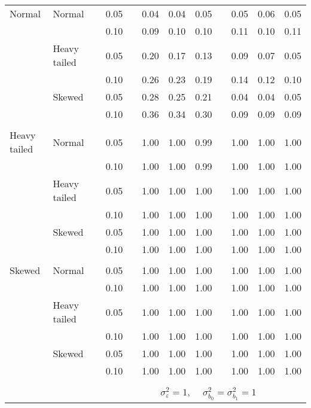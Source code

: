 \begin{table}[ht]
\begin{scriptsize}
\begin{tabular}{ll p{.1cm} c p{.1cm} rrr p{.1cm} rrr}
\rowcolor{gray!20}Normal       & Normal       && 0.05 &&  0.04 & 0.04 & 0.05 && 0.05 & 0.06 & 0.05 \\ 
\rowcolor{gray!20}             &              && 0.10 &&  0.09 & 0.10 & 0.10 && 0.11 & 0.10 & 0.11 \\ 
\rowcolor{gray!20}             & Heavy tailed && 0.05 &&  0.20 & 0.17 & 0.13 && 0.09 & 0.07 & 0.05 \\ 
\rowcolor{gray!20}             &              && 0.10 &&  0.26 & 0.23 & 0.19 && 0.14 & 0.12 & 0.10 \\ 
\rowcolor{gray!20}             & Skewed       && 0.05 &&  0.28 & 0.25 & 0.21 && 0.04 & 0.04 & 0.05 \\ 
\rowcolor{gray!20}             &              && 0.10 &&  0.36 & 0.34 & 0.30 && 0.09 & 0.09 & 0.09 \\ 
             &&&&&&&&&&&\\
Heavy tailed & Normal       && 0.05 &&  1.00 & 1.00 & 0.99 && 1.00 & 1.00 & 1.00 \\ 
             &              && 0.10 &&  1.00 & 1.00 & 0.99 && 1.00 & 1.00 & 1.00 \\ 
             & Heavy tailed && 0.05 &&  1.00 & 1.00 & 1.00 && 1.00 & 1.00 & 1.00 \\ 
             &              && 0.10 &&  1.00 & 1.00 & 1.00 && 1.00 & 1.00 & 1.00 \\ 
             & Skewed       && 0.05 &&  1.00 & 1.00 & 1.00 && 1.00 & 1.00 & 1.00 \\ 
             &              && 0.10 &&  1.00 & 1.00 & 1.00 && 1.00 & 1.00 & 1.00 \\ 
             &&&&&&&&&&&\\
Skewed       & Normal       && 0.05 &&  1.00 & 1.00 & 1.00 && 1.00 & 1.00 & 1.00 \\ 
             &              && 0.10 &&  1.00 & 1.00 & 1.00 && 1.00 & 1.00 & 1.00 \\ 
             & Heavy tailed && 0.05 &&  1.00 & 1.00 & 1.00 && 1.00 & 1.00 & 1.00 \\ 
             &              && 0.10 &&  1.00 & 1.00 & 1.00 && 1.00 & 1.00 & 1.00 \\ 
             & Skewed       && 0.05 &&  1.00 & 1.00 & 1.00 && 1.00 & 1.00 & 1.00 \\ 
             &              && 0.10 &&  1.00 & 1.00 & 1.00 && 1.00 & 1.00 & 1.00 \\ 

&&&&&&&&&&&\\
& && && \multicolumn{6}{c}{$\sigma_{\varepsilon}^2 = 1$, \ \ $\sigma_{b_0}^2 = \sigma_{b_1}^2 = 1$} \\ \cline{6-12}


\end{tabular}
\end{scriptsize}
\end{table}
